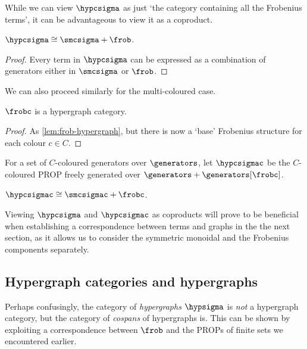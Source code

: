 While we can view \(\hypcsigma\) as just `the category containing all the
Frobenius terms', it can be advantageous to view it as a coproduct.

\begin{lemma}
    \(\hypcsigma \cong \smcsigma + \frob\).
\end{lemma}
\begin{proof}
    Every term in \(\hypcsigma\) can be expressed as a combination of
    generators either in \(\smcsigma\) or \(\frob\).
\end{proof}

We can also proceed similarly for the multi-coloured case.

\begin{lemma}\label{lem:frobc-hypergraph}
    \(\frobc\) is a hypergraph category.
\end{lemma}
\begin{proof}
    As \cref{lem:frob-hypergraph}, but there is now a `base' Frobenius
    structure for each colour \(c \in C\).
\end{proof}

\begin{definition}
    For a set of \(C\)-coloured generators over \(\generators\), let
    \(\hypcsigmac\) be the \(C\)-coloured PROP freely generated over
    \(\generators + \generators[\frobc]\).
\end{definition}

\begin{lemma}
    \(\hypcsigmac \cong \smcsigmac + \frobc\).
\end{lemma}

Viewing \(\hypcsigma\) and \(\hypcsigmac\) as coproducts will prove to be
beneficial when establishing a correspondence between terms and graphs in the
the next section, as it allows us to consider the symmetric monoidal and the
Frobenius components separately.

\subsection{Hypergraph categories and hypergraphs}

Perhaps confusingly, the category of \emph{hypergraphs} \(\hypsigma\) is
\emph{not} a hypergraph category, but the category of \emph{cospans} of
hypergraphs is.
This can be shown by exploiting a correspondence between \(\frob\) and the PROPs
of finite sets we encountered earlier.

